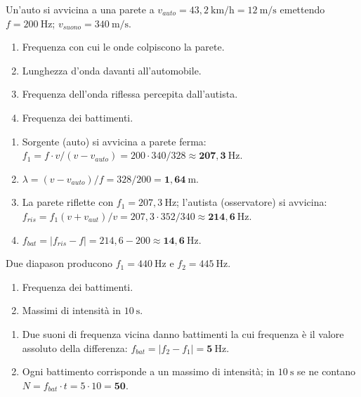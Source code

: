 \begin{question}[ID=3.6, subtitle={Auto che si avvicina a una parete: battimenti tra segnale diretto e riflesso}, tags={doppler, avvicinamento e allontanamento}, difficulty=media]
Un'auto si avvicina a una parete a $v_{auto} = 43{,}2\ \mathrm{km/h} = 12\ \mathrm{m/s}$ emettendo $f = 200\ \mathrm{Hz}$; $v_{suono} = 340\ \mathrm{m/s}$.
\begin{enumerate}
    \item Frequenza con cui le onde colpiscono la parete.
    \item Lunghezza d'onda davanti all'automobile.
    \item Frequenza dell'onda riflessa percepita dall'autista.
    \item Frequenza dei battimenti.
\end{enumerate}
\begin{solution}
\begin{enumerate}
\item Sorgente (auto) si avvicina a parete ferma: $f_1 = f\cdot v/(v-v_{auto}) = 200\cdot340/328 \approx \mathbf{207{,}3\ \mathrm{Hz}}$.
\item $\lambda = (v-v_{auto})/f = 328/200 = \mathbf{1{,}64\ \mathrm{m}}$.
\item La parete riflette con $f_1 = 207{,}3\ \mathrm{Hz}$; l'autista (osservatore) si avvicina: $f_{ris} = f_1(v+v_{aut})/v = 207{,}3\cdot352/340 \approx \mathbf{214{,}6\ \mathrm{Hz}}$.
\item $f_{bat} = |f_{ris} - f| = 214{,}6 - 200 \approx \mathbf{14{,}6\ \mathrm{Hz}}$.
\end{enumerate}
\end{solution}
\end{question}


\begin{question}[ID=4.2, subtitle={Battimenti tra due diapason a 440 e 445 Hz}, tags={battimenti, interferenza}, difficulty=facile]
Due diapason producono $f_1 = 440\ \mathrm{Hz}$ e $f_2 = 445\ \mathrm{Hz}$.
\begin{enumerate}
\item Frequenza dei battimenti.
\item Massimi di intensità in $10\ \mathrm{s}$.
\end{enumerate}
\begin{solution}
\begin{enumerate}
\item Due suoni di frequenza vicina danno battimenti la cui frequenza è il valore assoluto della differenza: $f_{bat} = |f_2 - f_1| = \mathbf{5\ \mathrm{Hz}}$.
\item Ogni battimento corrisponde a un massimo di intensità; in $10\ \mathrm{s}$ se ne contano $N = f_{bat}\cdot t = 5\cdot 10 = \mathbf{50}$.
\end{enumerate}
\end{solution}
\end{question}

